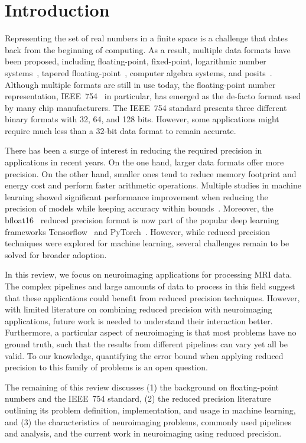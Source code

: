 \chapter{Introduction}
\label{ch:introduction}

Representing the set of real numbers in a finite space is a challenge that dates back from the beginning of computing.
As a result, multiple data formats have been proposed, including floating-point, fixed-point, 
logarithmic number systems~\cite{Kingsbury1971-kx}, tapered floating-point~\cite{Morris1971-qg}, 
computer algebra systems, and posits~\cite{Gustafson2017-wo}.
Although multiple formats are still in use today, the floating-point number 
representation, IEEE~754~\cite{4610935} in particular, has emerged as 
the de-facto format used by many chip manufacturers.
The IEEE~754 standard presents three different binary formats with 32, 64, and 128 bits.
However, some applications might require much less than a 32-bit data format to
remain accurate.

There has been a surge of interest in reducing the required precision in applications in recent years.
On the one hand, larger data formats offer more precision.
On the other hand, smaller ones tend to reduce memory footprint and energy cost
and perform faster arithmetic operations.
Multiple studies in machine learning showed significant performance improvement when reducing
the precision of models while keeping accuracy within bounds~\cite{Johnson2018-up, Wang2018-oo, Lesser2011-mn, Chen2018-an, Judd2015-kw, Vicuna2021-mw}.
Moreover, the bfloat16~\cite{bfloat16} reduced precision format is now part of the
popular deep learning frameworks Tensorflow~\cite{tensorflow2015-whitepaper} and PyTorch~\cite{Paszke2019-sm}.
However, while reduced precision techniques were explored for machine learning,
several challenges remain to be solved for broader adoption.

In this review, we focus on neuroimaging applications for processing MRI data.
The complex pipelines and large amounts of data to process in this field suggest that these
applications could benefit from reduced precision techniques.
However, with limited literature on combining reduced precision with neuroimaging
applications, future work is needed to understand their interaction better.
Furthermore, a particular aspect of neuroimaging is that most problems have no
ground truth,  such that the results from different pipelines can vary yet all be valid.
To our knowledge, quantifying the error bound when applying reduced precision to
this family of problems is an open question.

The remaining of this review discusses (1) the background on floating-point numbers
and the IEEE~754 standard, (2) the reduced precision literature outlining its
problem definition, implementation, and usage in machine learning, and (3) the
characteristics of neuroimaging problems, commonly used pipelines and analysis,
and the current work in neuroimaging using reduced precision.
